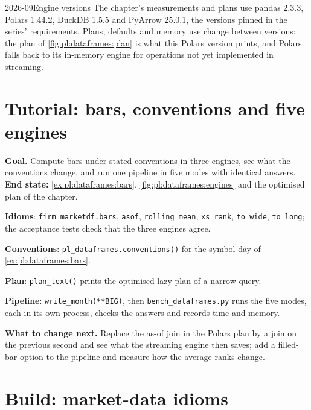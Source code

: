 \begin{dated}{2026-09}{Engine versions}\label{dat:pl:dataframes:versions}
The chapter's measurements and plans use pandas 2.3.3, Polars 1.44.2, DuckDB 1.5.5 and PyArrow 25.0.1, the versions pinned in the series'
requirements. Plans, defaults and memory use change between versions: the plan of \cref{fig:pl:dataframes:plan} is what this Polars
version prints, and Polars falls back to its in-memory engine for operations not yet implemented in streaming.
\end{dated}

\section{Tutorial: bars, conventions and five engines}\label{tut:pl:dataframes:tut}

\begin{tutorial}
\textbf{Goal.} Compute bars under stated conventions in three engines, see what the conventions change, and run one pipeline in five
modes with identical answers. \textbf{End state:} \cref{ex:pl:dataframes:bars}, \cref{fig:pl:dataframes:engines} and the optimised plan
of the chapter.
\begin{tutsteps}
\item \textbf{Idioms}: \texttt{firm\_marketdf.bars}, \texttt{asof}, \texttt{rolling\_mean}, \texttt{xs\_rank}, \texttt{to\_wide},
\texttt{to\_long}; the acceptance tests check that the three engines agree.
\item \textbf{Conventions}: \texttt{pl\_dataframes.conventions()} for the symbol-day of \cref{ex:pl:dataframes:bars}.
\item \textbf{Plan}: \texttt{plan\_text()} prints the optimised lazy plan of a narrow query.
\item \textbf{Pipeline}: \texttt{write\_month(**BIG)}, then \texttt{bench\_dataframes.py} runs the five modes, each in its own process,
checks the answers and records time and memory.
\end{tutsteps}
\textbf{What to change next.} Replace the as-of join in the Polars plan by a join on the previous second and see what the streaming
engine then saves; add a filled-bar option to the pipeline and measure how the average ranks change.
\end{tutorial}

\section{Build: market-data idioms}\label{bld:pl:dataframes:marketdf}

